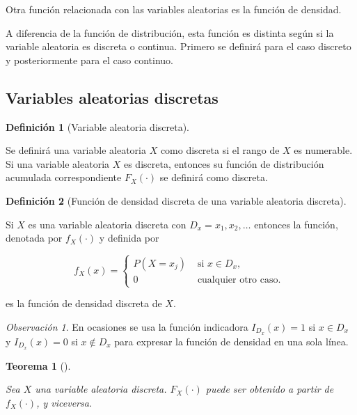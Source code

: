 \documentclass[
  us-letterpaper,
]{scrreprt}
\theoremstyle{plain}
\theoremstyle{definition}
\newtheorem{definition}{Definición}[chapter]
\theoremstyle{definition}
\theoremstyle{plain}
\newtheorem{theorem}{Teorema}[chapter]
\theoremstyle{remark}
\newtheorem*{remark}{Observación}
\begin{document}
Otra función relacionada con las variables aleatorias es la función de
densidad.

A diferencia de la función de distribución, esta función es distinta
según si la variable aleatoria es discreta o continua. Primero se
definirá para el caso discreto y posteriormente para el caso continuo.

\subsection{Variables aleatorias
discretas}\label{variables-aleatorias-discretas}

\begin{definition}[Variable aleatoria
discreta]\protect\hypertarget{def-vad}{}\label{def-vad}

Se definirá una variable aleatoria \(X\) como discreta si el rango de
\(X\) es numerable. Si una variable aleatoria \(X\) es discreta,
entonces su función de distribución acumulada correspondiente
\(F_X(\cdot)\) se definirá como discreta.

\end{definition}

\begin{definition}[Función de densidad discreta de una variable
aleatoria discreta]\protect\hypertarget{def-fdd}{}\label{def-fdd}

Si \(X\) es una variable aleatoria discreta con \(D_x=x_1,x_2,\ldots\)
entonces la función, denotada por \(f_X(\cdot)\) y definida por

\[ f_X(x)=\begin{cases}P(X=x_j) & \text{ si } x\in D_x,\\ 0 & \text{ cualquier otro caso. }\end{cases} \]

es la función de densidad discreta de \(X\).

\end{definition}

\begin{remark}
En ocasiones se usa la función indicadora \(I_{D_x}(x)=1\) si
\(x\in D_x\) y \(I_{D_x}(x)=0\) si \(x\notin D_x\) para expresar la
función de densidad en una sola línea.
\end{remark}

\begin{theorem}[]\protect\hypertarget{thm-uno}{}\label{thm-uno}

Sea \(X\) una variable aleatoria discreta. \(F_X(\cdot)\) puede ser
obtenido a partir de \(f_X(\cdot)\), y viceversa.

\end{theorem}
\end{document}

